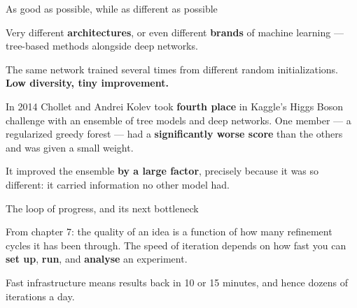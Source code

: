 \documentclass[aspectratio=169,11pt,t]{beamer}
\begin{document}
\begin{frame}[shrink=25]{As good as possible, while as different as possible}
\begin{minipage}[t]{0.494\textwidth}
\begin{icardgood}
Very different \textbf{architectures}, or even different \textbf{brands} of machine learning --- tree-based methods alongside deep networks.
\end{icardgood}
\end{minipage}%
\hfill
\begin{minipage}[t]{0.494\textwidth}
\begin{icardbad}
The same network trained several times from different random initializations. \textbf{Low diversity, tiny improvement.}
\end{icardbad}
\end{minipage}%
{\fontsize{9.4}{12.6}\selectfont\color{fg2}In 2014 Chollet and Andrei Kolev took \textbf{fourth place} in Kaggle's Higgs Boson challenge with an ensemble of tree models and deep networks. One member --- a regularized greedy forest --- had a \textbf{significantly worse score} than the others and was given a small weight.\par}\vskip 4pt
\begin{iband}[signal]
It improved the ensemble \textbf{by a large factor}, precisely because it was so different: it carried information no other model had. 
\end{iband}
\end{frame}


\begin{frame}[shrink=25]{The loop of progress, and its next bottleneck}
{\fontsize{9.4}{12.6}\selectfont\color{fg2}From chapter 7: the quality of an idea is a function of how many refinement cycles it has been through. The speed of iteration depends on how fast you can \textbf{set up}, \textbf{run}, and \textbf{analyse} an experiment.\par}\vskip 4pt
{\fontsize{9.4}{12.6}\selectfont\color{fg2}Fast infrastructure means results back in 10 or 15 minutes, and hence dozens of iterations a day. \par}\vskip 4pt
\end{frame}
\end{document}
